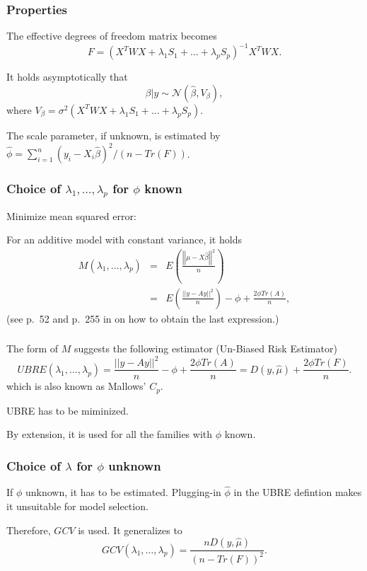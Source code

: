 \documentclass{beamer}
\newcommand{\bs}{\bigskip}
\begin{document}
\begin{frame}
\frametitle{Properties}

The effective degrees of freedom matrix becomes
$$F = (X^T  WX + \lambda_1 S_1 + \ldots + \lambda_p S_p)^{-1} X^T W X .$$

\bigskip
It holds asymptotically that
$$ \beta | y \sim {\mathcal N}(\hat{\beta}, V_{\beta}),$$
where $V_{\beta} = \sigma^2 (X^T W X + \lambda_1 S_1 + \ldots + \lambda_p S_p)$.

\bigskip
The scale parameter, if unknown, is estimated by
$\hat{\phi} = \sum_{i=1}^n (y_i - X_i \hat{\beta})^2/ (n - Tr(F))$. 

\end{frame}


\begin{frame}
\frametitle{Choice of $\lambda_1,\ldots,\lambda_p$ for $\phi$ known}

Minimize mean squared error:

\bs
For an additive model with constant variance, it holds
\begin{eqnarray*}
M(\lambda_1,\ldots,\lambda_p) & = &  E \left( \frac{ \left|\left| \mu - X \hat{\beta}  \right|\right|^2}{n} \right) \\
& = & E \left( \frac{ \left|\left| y - A y  \right|\right|^2}{n} \right) - \phi + \frac{2 \phi Tr(A)}{n},  
\end{eqnarray*}
(see p.~52 and p.~255 in  on how to obtain the last expression.)

\end{frame}


\begin{frame}
\frametitle{}
The form of $M$ suggests the following estimator (Un-Biased Risk Estimator)
$$ UBRE(\lambda_1,\ldots,\lambda_p) = \frac{ \left|\left| y - Ay  \right|\right|^2}{n}   - \phi + \frac{2 \phi Tr(A)}{n} = D(y,\hat{\mu}) + \frac{2 \phi Tr(F)}{n}.$$
which is also known as Mallows' $C_p$.

\bs 
UBRE has to be miminized.

\bs
By extension, it is used for all the families with $\phi$ known.
\end{frame}

\begin{frame}
\frametitle{Choice of $\lambda$ for $\phi$ unknown}

If $\phi$ unknown, it has to be estimated. Plugging-in $\hat{\phi}$ in the UBRE defintion makes it unsuitable for model selection.

\bs
Therefore, $GCV$ is used. It generalizes to 
$$ GCV(\lambda_1, \ldots,\lambda_p) = \frac{n D(y,\hat{\mu})}{(n- Tr(F))^2}.$$
\end{frame}
\end{document}
